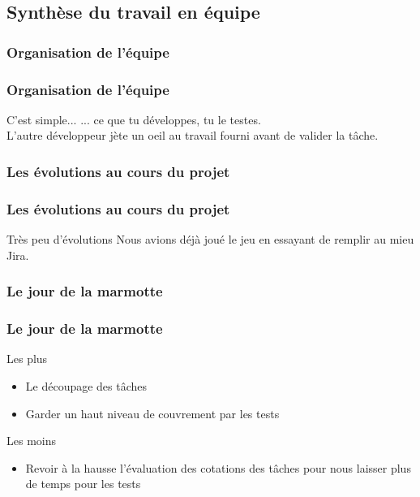 \documentclass{beamer}
\begin{document}
    \subsection{Synthèse du travail en équipe}
      
      \subsubsection{Organisation de l'équipe}
      \begin{frame}
        \frametitle{Organisation de l'équipe}
        \begin{block}{C'est simple...}
          ... ce que tu développes, tu le testes.\\
          L'autre développeur jète un oeil au travail fourni avant de valider la tâche.
        \end{block}
      \end{frame}
      
      \subsubsection{Les évolutions au cours du projet}
      \begin{frame}
        \frametitle{Les évolutions au cours du projet}
        \begin{block}{Très peu d'évolutions}
          Nous avions déjà joué le jeu en essayant de remplir au mieu Jira.\\
        \end{block}
      \end{frame}
      
      \subsubsection{Le jour de la marmotte}
      \begin{frame}
        \frametitle{Le jour de la marmotte}
        \begin{block}{Les plus}
          \begin{itemize}
            \item Le découpage des tâches
            \item Garder un haut niveau de couvrement par les tests
          \end{itemize}
        \end{block}
        \begin{block}{Les moins}
          \begin{itemize}
            \item Revoir à la hausse l'évaluation des cotations des tâches pour nous laisser plus de temps pour les tests
          \end{itemize}
        \end{block}
      \end{frame}
      
\end{document}

